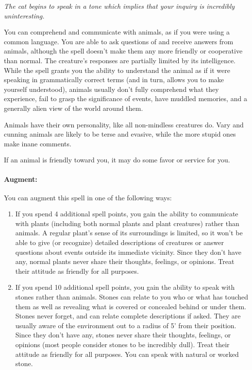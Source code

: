 \emph{The cat begins to speak in a tone which implies that your inquiry is incredibly uninteresting.}

You can comprehend and communicate with animals, as if you were using a common language.
You are able to ask questions of and receive answers from animals, although the spell doesn't make them any more friendly or cooperative than normal.
The creature's responses are partially limited by its intelligence. While the spell grants you the ability to understand the animal as if it were speaking in grammatically correct terms (and in turn, allows you to make yourself understood), animals usually don't fully comprehend what they experience, fail to grasp the significance of events, have muddled memories, and a generally alien view of the world around them.

Animals have their own personality, like all non-mindless creatures do. Vary and cunning animals are likely to be terse and evasive, while the more stupid ones make inane comments.

If an animal is friendly toward you, it may do some favor or service for you.

\paragraph{Augment:} You can augment this spell in one of the following ways:
\begin{enumerate}
 \item If you spend 4 additional spell points, you gain the ability to communicate with plants (including both normal plants and plant creatures) rather than animals. 
 A regular plant's sense of its surroundings is limited, so it won't be able to give (or recognize) detailed descriptions of creatures or answer questions about events outside its immediate vicinity. Since they don't have any, normal plants never share their thoughts, feelings, or opinions. Treat their attitude as friendly for all purposes.
  \item If you spend 10 additional spell points, you gain the ability to speak with stones rather than animals. Stones can relate to you who or what has touched them as well as revealing what is covered or concealed behind or under them. Stones never forget, and can relate complete descriptions if asked. They are usually aware of the environment out to a radius of 5' from their position. Since they don't have any, stones never share their thoughts, feelings, or opinions (most people consider stones to be incredibly dull). Treat their attitude as friendly for all purposes. You can speak with natural or worked stone.
\end{enumerate}
